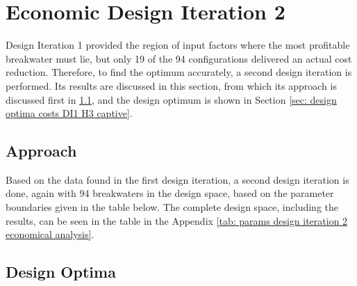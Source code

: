 \section{Economic Design Iteration 2}
\label{sec: economical DI2 H3}

Design Iteration 1 provided the region of input factors where the most profitable breakwater must lie, but only 19 of the 94 configurations delivered an actual cost reduction. Therefore, to find the optimum accurately, a second design iteration is performed. Its results are discussed in this section, from which its approach is discussed first in \ref{sec: approach design iteration 2 costs H3 captive}, and the design optimum is shown in Section \ref{sec: design optima costs DI1 H3 captive}.

\subsection{Approach}
\label{sec: approach design iteration 2 costs H3 captive}

Based on the data found in the first design iteration, a second design iteration is done, again with 94 breakwaters in the design space, based on the parameter boundaries given in the table below. The complete design space, including the results, can be seen in the table in the Appendix \ref{tab: params design iteration 2 economical analysis}.


\begin{table}[h]
\centering
{}
\caption{Boundaries Design Space Captive Design Iteration 2 Costs}
\label{tab: boundaries DI2 captive}
\end{table}


\subsection{Design Optima}
\label{sec: design optima design iteration 2 costs H3 captive}

